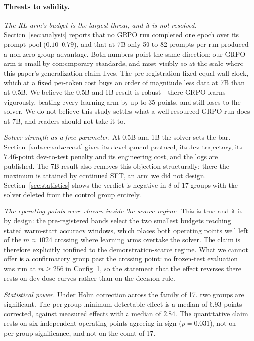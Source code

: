 \paragraph{Threats to validity.}

\emph{The RL arm's budget is the largest threat, and it is not resolved.}
Section~\ref{sec:analysis} reports that no GRPO run completed one epoch over its
prompt pool ($0.10$--$0.79$), and that at 7B only 50 to 82 prompts per run
produced a non-zero group advantage. Both numbers point the same direction: our
GRPO arm is small by contemporary standards, and most visibly so at the scale
where this paper's generalization claim lives. The pre-registration fixed equal
wall clock, which at a fixed per-token cost buys an order of magnitude less data
at 7B than at 0.5B. We believe the 0.5B and 1B result is robust---there GRPO
learns vigorously, beating every learning arm by up to 35 points, and still
loses to the solver. We do not believe this study settles what a
well-resourced GRPO run does at 7B, and readers should not take it to.

\emph{Solver strength as a free parameter.} At 0.5B and 1B the solver sets the
bar. Section~\ref{subsec:solvercost} gives its development protocol, its dev
trajectory, its $7.46$-point dev-to-test penalty and its engineering cost, and
the logs are published. The 7B result also removes this objection structurally:
there the maximum is attained by continued SFT, an arm we did not design.
Section~\ref{sec:statistics} shows the verdict is negative in 8 of 17 groups
with the solver deleted from the control group entirely.

\emph{The operating points were chosen inside the scarce regime.} This is true
and it is by design: the pre-registered bands select the two smallest budgets
reaching stated warm-start accuracy windows, which places both operating points
well left of the $m \approx 1024$ crossing where learning arms overtake the
solver. The claim is therefore explicitly confined to the demonstration-scarce
regime. What we cannot offer is a confirmatory group past the crossing point: no
frozen-test evaluation was run at $m \geq 256$ in Config~1, so the statement
that the effect reverses there rests on dev dose curves rather than on the
decision rule.

\emph{Statistical power.} Under Holm correction across the family of 17, two
groups are significant. The per-group minimum detectable effect is a median of
$6.93$ points corrected, against measured effects with a median of $2.84$. The
quantitative claim rests on six independent operating points agreeing in sign
($p = 0.031$), not on per-group significance, and not on the count of 17.

